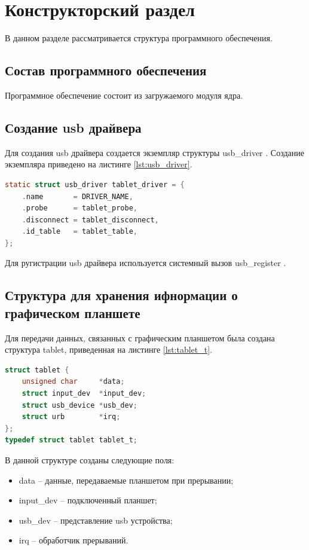 \chapter{Конструкторский раздел}
\label{cha:design}

В данном разделе рассматривается структура программного обеспечения.

\section{Состав программного обеспечения}

Программное обеспечение состоит из загружаемого модуля ядра.

\section{Создание usb драйвера}

Для создания usb драйвера создается экземпляр структуры usb\_driver \cite{Usb_driver}. Создание экземпляра приведено на листинге \ref{lst:usb_driver}.

\begin{lstlisting}[language=c,caption=Создание экземпляра usb драйвера,label=lst:usb_driver]
static struct usb_driver tablet_driver = {
    .name       = DRIVER_NAME,
    .probe      = tablet_probe,
    .disconnect = tablet_disconnect,
    .id_table   = tablet_table,
};
\end{lstlisting}

Для ругистрации usb драйвера используется системный вызов usb\_register \cite{Usb_register}.

\section{Структура для хранения ифнормации о графическом планшете}

Для передачи данных, связанных с графическим планшетом была создана структура tablet, приведенная на листинге \ref{lst:tablet_t}.

\begin{lstlisting}[language=c,caption=Структура планшета,label=lst:tablet_t]
struct tablet {
    unsigned char     *data;
    struct input_dev  *input_dev;
    struct usb_device *usb_dev;
    struct urb        *irq;
};
typedef struct tablet tablet_t;
\end{lstlisting}

В данной структуре созданы следующие поля:

\begin{itemize}
    \item data -- данные, передаваемые планшетом при прерывании;
    \item input\_dev -- подключенный планшет;
    \item usb\_dev -- представление usb устройства;
    \item irq -- обработчик прерываний.
\end{itemize}

